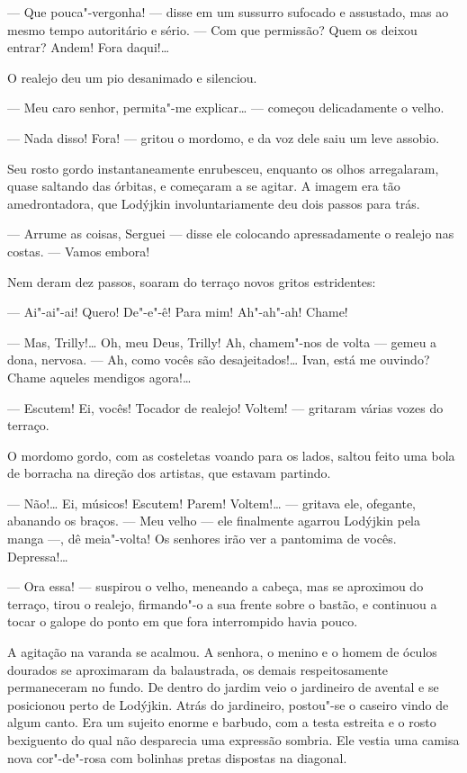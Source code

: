 --- Que pouca"-vergonha! --- disse em um sussurro sufocado e assustado,
mas ao mesmo tempo autoritário e sério. --- Com que permissão? Quem os
deixou entrar? Andem! Fora daqui!\ldots{}

O realejo deu um pio desanimado e silenciou.

--- Meu caro senhor, permita"-me explicar\ldots{} --- começou delicadamente o
velho.

--- Nada disso! Fora! --- gritou o mordomo, e da voz dele saiu um leve
assobio.

Seu rosto gordo instantaneamente enrubesceu, enquanto os olhos
arregalaram, quase saltando das órbitas, e começaram a se agitar. A
imagem era tão amedrontadora, que Lodýjkin involuntariamente deu dois
passos para trás.

--- Arrume as coisas, Serguei --- disse ele colocando apressadamente o
realejo nas costas. --- Vamos embora!

Nem deram dez passos, soaram do terraço novos gritos estridentes:

--- Ai"-ai"-ai! Quero! De"-e"-ê! Para mim! Ah"-ah"-ah! Chame!

--- Mas, Trilly!\ldots{} Oh, meu Deus, Trilly! Ah, chamem"-nos de volta ---
gemeu a dona, nervosa. --- Ah, como vocês são desajeitados!\ldots{} Ivan,
está me ouvindo? Chame aqueles mendigos agora!\ldots{}

--- Escutem! Ei, vocês! Tocador de realejo! Voltem! --- gritaram várias
vozes do terraço.

O mordomo gordo, com as costeletas voando para os lados, saltou feito
uma bola de borracha na direção dos artistas, que estavam partindo.

--- Não!\ldots{} Ei, músicos! Escutem! Parem! Voltem!\ldots{} --- gritava ele,
ofegante, abanando os braços. --- Meu velho --- ele finalmente agarrou
Lodýjkin pela manga ---, dê meia"-volta! Os senhores irão ver a pantomima
de vocês. Depressa!\ldots{}

--- Ora essa! --- suspirou o velho, meneando a cabeça, mas se aproximou
do terraço, tirou o realejo, firmando"-o a sua frente sobre o bastão, e
continuou a tocar o galope do ponto em que fora interrompido havia
pouco.

A agitação na varanda se acalmou. A senhora, o menino e o homem de
óculos dourados se aproximaram da balaustrada, os demais respeitosamente
permaneceram no fundo. De dentro do jardim veio o jardineiro de avental
e se posicionou perto de Lodýjkin. Atrás do jardineiro, postou"-se o
caseiro vindo de algum canto. Era um sujeito enorme e barbudo, com a
testa estreita e o rosto bexiguento do qual não desparecia uma expressão
sombria. Ele vestia uma camisa nova cor"-de"-rosa com bolinhas pretas
dispostas na diagonal.


